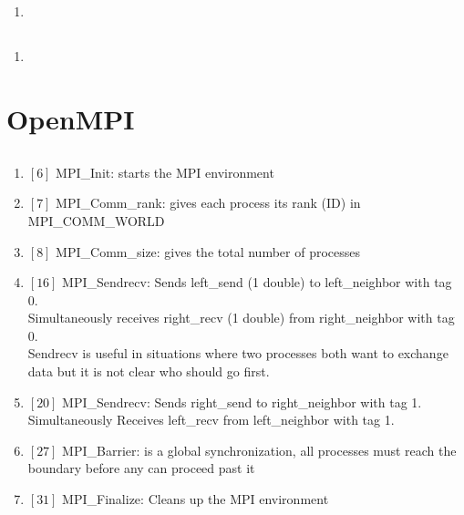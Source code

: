 \documentclass[12pt]{article}
\begin{document}
\subsection{}
\begin{enumerate}
	\item 
\end{enumerate}

\subsection{}
\begin{enumerate}
	\item 
\end{enumerate}

\section{OpenMPI}

\subsection{}
\begin{enumerate}
	\item $[6]$ MPI\_Init: starts the MPI environment
	\item $[7]$ MPI\_Comm\_rank:  gives each process its rank (ID) in MPI\_COMM\_WORLD
	\item $[8]$ MPI\_Comm\_size: gives the total number of processes
	\item $[16]$ MPI\_Sendrecv: Sends left\_send (1 double) to left\_neighbor with tag 0.\\
	Simultaneously receives right\_recv (1 double) from right\_neighbor with tag 0.\\
	Sendrecv is useful in situations where two processes both want to exchange data but it is not clear who should go first.
	\item $[20]$ MPI\_Sendrecv: Sends right\_send to right\_neighbor with tag 1.\\
	Simultaneously Receives left\_recv from left\_neighbor with tag 1.
	
	\item $[27]$ MPI\_Barrier: is a global synchronization, all processes must reach the boundary before any can proceed past it
	
	\item $[31]$ MPI\_Finalize: Cleans up the MPI environment
\end{enumerate}
\end{document}
